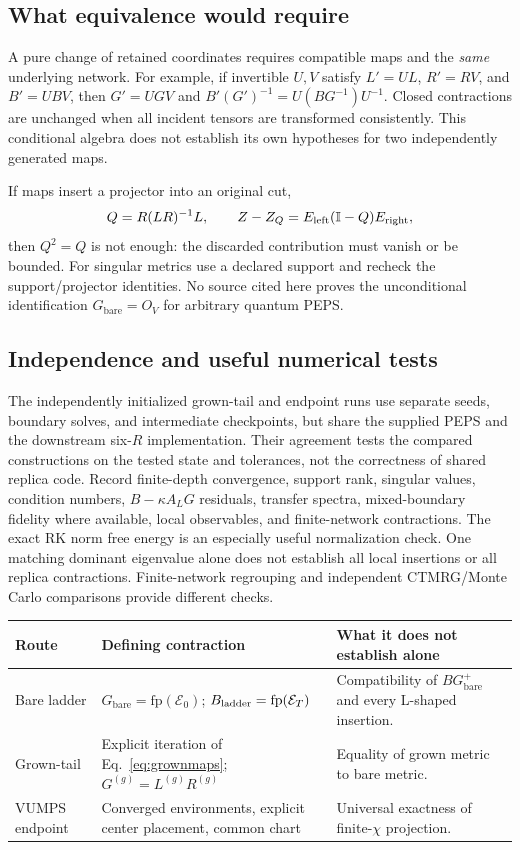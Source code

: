 \documentclass[11pt]{article}
\newcommand{\id}{\mathbb I}
\newcommand{\Gz}{G_{\mathrm{bare}}}
\begin{document}
\subsection{What equivalence would require}
A pure change of retained coordinates requires compatible maps and the
\emph{same} underlying network. For example, if invertible $U,V$ satisfy
$L'=UL$, $R'=RV$, and $B'=UBV$, then $G'=UGV$ and
$B'(G')^{-1}=U(BG^{-1})U^{-1}$. Closed contractions are unchanged when all
incident tensors are transformed consistently. This conditional algebra
does not establish its own hypotheses for two independently generated maps.

If maps insert a projector into an original cut,
\begin{equation}
 Q=R(LR)^{-1}L,\qquad
 Z-Z_Q=E_{\rm left}(\id-Q)E_{\rm right},
\end{equation}
then $Q^2=Q$ is not enough: the discarded contribution must vanish or be bounded.
For singular metrics use a declared support and recheck the support/projector
identities. No source cited here proves the unconditional identification
$\Gz=O_V$ for arbitrary quantum PEPS.

\ifdetailed
\subsection{Independence and useful numerical tests}
The independently initialized grown-tail and endpoint runs use separate seeds, boundary solves,
and intermediate checkpoints, but share the supplied PEPS and the downstream
six-$R$ implementation. Their agreement tests the compared constructions on
the tested state and tolerances, not the correctness of shared replica code.
Record finite-depth convergence, support rank, singular values, condition
numbers, $B-\kappa A_LG$ residuals, transfer spectra, mixed-boundary fidelity
where available, local observables, and finite-network contractions.
The exact RK norm free energy is an especially useful normalization check.
One matching dominant eigenvalue alone does not establish all local insertions
or all replica contractions. Finite-network regrouping and independent
CTMRG/Monte Carlo comparisons provide different checks.

\begin{center}\small
\begin{tabular}{p{35mm}p{54mm}p{54mm}}
\toprule
Route & Defining contraction & What it does not establish alone\\\midrule
Bare ladder & $\Gz=\mathrm{fp}(\mathcal E_0)$;
 $B_{\rm ladder}=\mathrm{fp}(\mathcal E_T)$ & Compatibility of $B\Gz^+$ and every L-shaped insertion.\\
Grown-tail & Explicit iteration of Eq.~\eqref{eq:grownmaps}; $G^{(g)}=L^{(g)}R^{(g)}$ & Equality of grown metric to bare metric.\\
VUMPS endpoint & Converged environments, explicit center placement, common chart & Universal exactness of finite-$\chi$ projection.\\
\bottomrule
\end{tabular}
\end{center}
\fi
\end{document}
